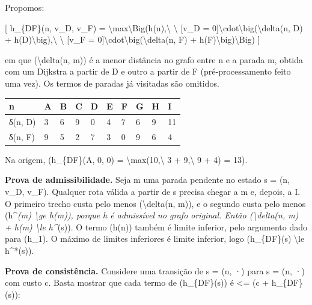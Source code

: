\documentclass[12pt, a4paper]{article}
\begin{document}
Propomos:

{[} h\_\{DF\}(n, v\_D, v\_F) = \textbackslash max\textbackslash Big(h(n),\textbackslash{} \textbackslash{} {[}v\_D = 0{]}\textbackslash cdot\textbackslash big(\textbackslash delta(n, D) + h(D)\textbackslash big),\textbackslash{} \textbackslash{} {[}v\_F = 0{]}\textbackslash cdot\textbackslash big(\textbackslash delta(n, F) + h(F)\textbackslash big)\textbackslash Big) {]}

em que (\textbackslash delta(n, m)) é a menor distância no grafo entre n e a parada m, obtida com um Dijkstra a partir de D e outro a partir de F (pré-processamento feito uma vez). Os termos de paradas já visitadas são omitidos.

\begin{longtable}{@{}llllllllll@{}}
\toprule\noalign{}
n & A & B & C & D & E & F & G & H & I \\
\midrule\noalign{}
\endhead
\bottomrule\noalign{}
\endlastfoot
δ(n, D\allowbreak ) & 3 & 6 & 9 & 0 & 4 & 7 & 6 & 9 & 11 \\
δ(n, F\allowbreak ) & 9 & 5 & 2 & 7 & 3 & 0 & 9 & 6 & 4 \\
\end{longtable}

Na origem, (h\_\{DF\}(A, 0, 0) = \textbackslash max(10,\textbackslash{} 3 + 9,\textbackslash{} 9 + 4) = 13).

\textbf{Prova de admissibilidade.} Seja m uma parada pendente no estado s = (n, v\_D, v\_F). Qualquer rota válida a partir de s precisa chegar a m e, depois, a I. O primeiro trecho custa pelo menos (\textbackslash delta(n, m)), e o segundo custa pelo menos (h\^{}\emph{(m) \textbackslash ge h(m)), porque h é admissível no grafo original. Então (\textbackslash delta(n, m) + h(m) \textbackslash le h\^{}}(s)). O termo (h(n)) também é limite inferior, pelo argumento dado para (h\_1). O máximo de limites inferiores é limite inferior, logo (h\_\{DF\}(s) \textbackslash le h\^{}*(s)).

\textbf{Prova de consistência.} Considere uma transição de s = (n, ·) para s\textquotesingle{} = (n\textquotesingle, ·) com custo c. Basta mostrar que cada termo de (h\_\{DF\}(s)) é <= (c + h\_\{DF\}(s\textquotesingle)):
\end{document}
